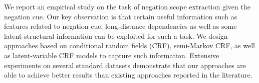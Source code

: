 We report an empirical study on the task of negation scope extraction given the negation cue. Our key observation is that certain useful information such as features related to negation cue, long-distance dependencies as well as some latent structural information can be exploited for such a task. We design approaches based on conditional random fields (CRF), semi-Markov CRF, as well as latent-variable CRF models to capture such information. Extensive experiments on several standard datasets demonstrate that our approaches are able to achieve better results than existing approaches reported in the literature.
